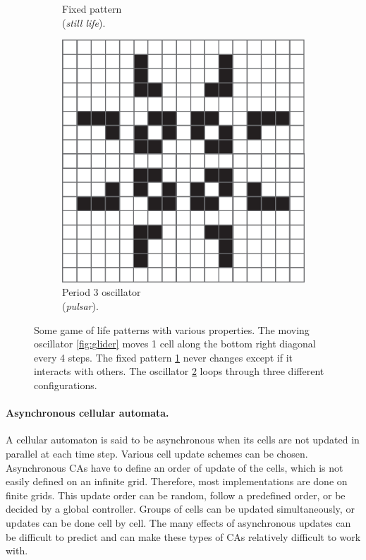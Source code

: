 \begin{figure}[htbp]
\begin{subfigure}[t]{.31\linewidth}
    \caption{Fixed pattern\\ (\emph{still life}).}
    \label{fig:still_life}
  \end{subfigure}
  \begin{subfigure}[t]{.31\linewidth}
    \centering
    \includegraphics[width=\linewidth]{figures/pulsar.pdf}
    \caption{Period 3 oscillator\\ (\emph{pulsar}).}
    \label{fig:pulsar}
  \end{subfigure}

  \caption{Some game of life patterns with various properties. The moving
    oscillator \ref{fig:glider} moves 1 cell along the bottom right diagonal
    every 4 steps. The fixed pattern \ref{fig:still_life} never changes except
    if it interacts with others. The oscillator \ref{fig:pulsar} loops through
    three different configurations.}
  \label{fig:gol_patterns}
\end{figure}


\paragraph{Asynchronous cellular automata.}
A cellular automaton is said to be asynchronous when its cells are not
updated in parallel at each time step. Various cell update schemes can be
chosen. Asynchronous \acp{CA} have to define an
order of update of the cells, which is not easily defined on an infinite grid.
Therefore, most implementations are done on finite grids.
This update order can be random, follow a predefined order, or be decided by a
global controller. Groups of cells can be updated simultaneously, or updates can
be done cell by cell. The many effects of asynchronous updates can be difficult
to predict and can make these types of \acp{CA} relatively difficult to work with.

